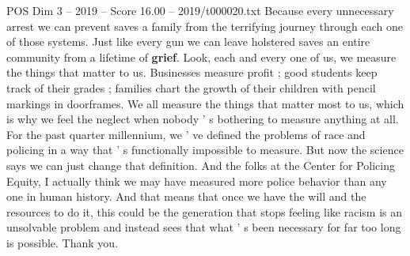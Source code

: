 \begin{textsample}{POS Dim 3 – 2019 – Score 16.00 – 2019/t000020.txt}
Because every unnecessary arrest we can prevent saves a family from the terrifying journey through each one of those systems.
Just like every gun we can leave holstered saves an entire community from a lifetime of \textbf{grief}.
Look, each and every one of us, we measure the things that matter to us.
Businesses measure profit ; good students keep track of their grades ; families chart the growth of their children with pencil markings in doorframes.
We all measure the things that matter most to us, which is why we feel the neglect when nobody ' s bothering to measure anything at all.
For the past quarter millennium, we ' ve defined the problems of race and policing in a way that ' s functionally impossible to measure.
But now the science says we can just change that definition.
And the folks at the Center for Policing Equity, I actually think we may have measured more police behavior than any one in human history.
And that means that once we have the will and the resources to do it, this could be the generation that stops feeling like racism is an unsolvable problem and instead sees that what ' s been necessary for far too long is possible.
Thank you.

\end{textsample}

